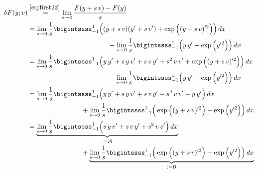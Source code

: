 \documentclass[12pt]{article}
\begin{document}
\begin{align}
	\delta F(y;v)
	 & \stackrel{\eqref{eq:first22}}{:=}
	\lim_{s\to 0}\frac{F(y+s\,v)-F(y)}{s}   \notag \\
	 & =  \lim_{s\to 0} \frac{1}{s}
	\bigintssss_{-1}^{1}
	\Big(
	(y+s\,v) (y^\prime+s\,v^\prime)
	+ \exp{\Big((y+s\,v)^{\prime 2}\Big)}
	\Big)\,dx                               \notag \\
	 & \qquad\qquad\qquad\qquad\qquad\qquad
	-\lim_{s\to 0} \frac{1}{s}
	\bigintssss_{-1}^{1}
	\Big(
	y\,y' + \exp{\Big(y^{\prime 2}\Big)}
	\Big)\,dx                               \notag \\     
	 & =  \lim_{s\to 0} \frac{1}{s}
	\bigintssss_{-1}^{1}
	\Big(
	y\,y^\prime 
	+ s\,y\,v^\prime  
	+ s\,v\,y^\prime
	+ s^2\,v\,v^\prime
	+ \exp{\Big((y+s\,v)^{\prime 2}\Big)}
	\Big)\,dx                               \notag \\
	 & \qquad\qquad\qquad\qquad\qquad\qquad
	-\lim_{s\to 0} \frac{1}{s}
	\bigintssss_{-1}^{1}
	\Big(
	y\,y' + \exp{\Big(y^{\prime 2}\Big)}
	\Big)\,dx                               \notag \\ 
	 & =  \lim_{s\to 0} \frac{1}{s}
	\bigintssss_{-1}^{1}
	\Big(
	y\,y^\prime 
	+ s\,y\,v^\prime  
	+ s\,v\,y^\prime
	+ s^2\,v\,v^\prime
	- y\,y^\prime
	\Big)\,dx                               \notag \\
	 & \qquad\qquad\qquad\qquad
	+\lim_{s\to 0} \frac{1}{s}
	\bigintssss_{-1}^{1}
	\Big(
	\exp{\Big((y+s\,v)^{\prime 2}\Big)}
	- \exp{\Big(y^{\prime 2}\Big)}
	\Big)\,dx                               \notag \\ 
	 & =  
	\underbrace{\lim_{s\to 0} \frac{1}{s}
		\bigintssss_{-1}^{1}
		\Big(
		s\,y\,v^\prime  
		+ s\,v\,y^\prime
		+ s^2\,v\,v^\prime
		\Big)
		\,dx}_{:=\mathcal{A}}                   \notag \\
	 & \qquad\qquad\qquad\qquad
	+
	\underbrace{\lim_{s\to 0} \frac{1}{s}
		\bigintssss_{-1}^{1}
		\Big(
		\exp{\Big((y+s\,v)^{\prime 2}\Big)}
		- \exp{\Big(y^{\prime 2}\Big)}
		\Big)\,dx}_{:=\mathcal{B}}
\end{align}
\end{document}
